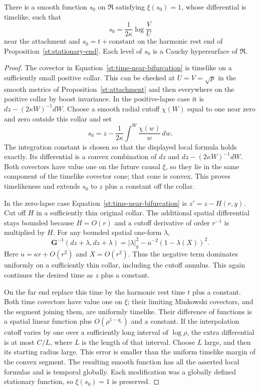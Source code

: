 \begin{lemma}\label{st:temporal-graph}
There is a smooth function $s_0$ on $\mathfrak R$ satisfying
$\xi(s_0)=1$, whose differential is timelike, such that
\begin{equation}\label{st:time-near-bifurcation}
 s_0=\frac{1}{2\kappa}\log\frac VU
\end{equation}
near the attachment and $s_0=t+\mathrm{constant}$ on the harmonic
rest end of Proposition~\ref{st:stationary-end}.  Each level of $s_0$ is
a Cauchy hypersurface of $\mathfrak R$.
\end{lemma}

\begin{proof}
The covector in Equation~\eqref{st:time-near-bifurcation} is
timelike on a sufficiently small positive collar.  This can be
checked at $U=V=\sqrt p$ in the smooth metrics of
Proposition~\ref{st:attachment} and then everywhere on the positive
collar by boost invariance.  In the positive-lapse case it is
$dz-(2\kappa W)^{-1}dW$.  Choose a smooth radial cutoff $\chi(W)$
equal to one near zero and zero outside this collar and set
\[
 s_0=z-\frac1{2\kappa}\int^W\frac{\chi(w)}{w}\,dw.
\]
The integration constant is chosen so that the displayed local
formula holds exactly.  Its differential is a convex combination
of $dz$ and $dz-(2\kappa W)^{-1}dW$.  Both covectors have value
one on the future causal $\xi$, so they lie in the same component
of the timelike covector cone; that cone is convex.  This proves
timelikeness and extends $s_0$ to $z$ plus a constant off the collar.

In the zero-lapse case Equation~\eqref{st:time-near-bifurcation}
is $z'=z-H(r,y)$.  Cut off $H$ in a sufficiently thin original
collar.  The additional spatial differential stays bounded because
$H=O(r)$ and a cutoff derivative of order $r^{-1}$ is multiplied
by $H$.  For any bounded spatial one-form $\lambda$,
\[
 \mathbf G^{-1}(dz+\lambda,dz+\lambda)
 =|\lambda|_g^2-u^{-2}(1-\lambda(X))^2.
\]
Here $u=\kappa r+O(r^2)$ and $X=O(r^2)$.  Thus the negative term
dominates uniformly on a sufficiently thin collar, including the
cutoff annulus.  This again continues the desired time as $z$ plus
a constant.

On the far end replace this time by the harmonic rest time $t$
plus a constant.  Both time covectors have value one on $\xi$;
their limiting Minkowski covectors, and the segment joining them,
are uniformly timelike.  Their difference of functions is a spatial
linear function plus $O(\rho^{1-q_1})$ and a constant.  If the
interpolation cutoff varies by one over a sufficiently long interval
of $\log\rho$, the extra differential is at most $C/L$, where
$L$ is the length of that interval.  Choose $L$ large, and then its
starting radius large.  This error is smaller than the uniform
timelike margin of the convex segment.  The resulting smooth
function has all the asserted local formulas and is temporal
globally.  Each modification was a globally defined stationary
function, so $\xi(s_0)=1$ is preserved.


\end{proof}
